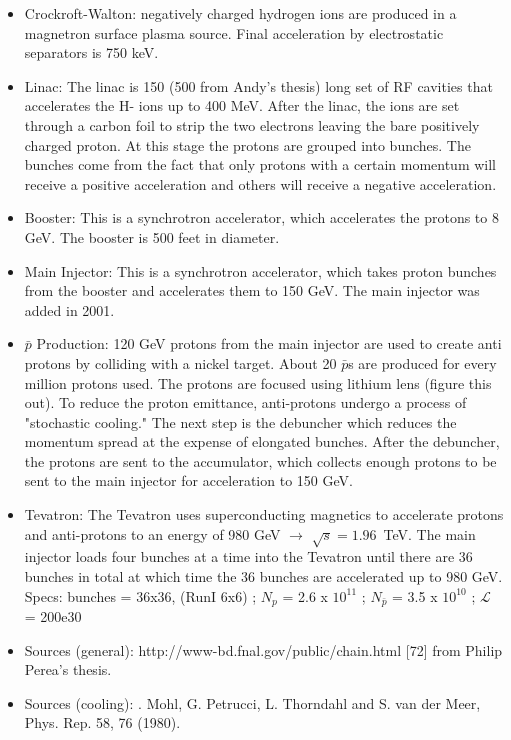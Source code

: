  
\begin{itemize}
\item Crockroft-Walton: negatively charged hydrogen ions are produced in a magnetron surface plasma source. Final acceleration by electrostatic separators is 750 keV.
\item Linac: The linac is 150 (500 from Andy's thesis) long set of RF cavities that accelerates the H- ions up to 400 MeV. After the linac, the ions are set through a carbon foil to strip the two electrons leaving the bare positively charged proton. At this stage the protons are grouped into bunches. The bunches come from the fact that only protons with a certain momentum will receive a positive acceleration and others will receive a negative acceleration. 
\item Booster: This is a synchrotron accelerator, which accelerates the protons to 8 GeV. The booster is 500 feet in diameter. 
\item Main Injector: This is a synchrotron accelerator, which takes proton bunches from the booster and accelerates them to 150 GeV. The main injector was added in 2001.
\item $\bar{p}$ Production: 120 GeV protons from the main injector are used to create anti protons by colliding with a nickel target. About 20 $\bar{p}$s are produced for every million protons used. The protons are focused using lithium lens (figure this out). To reduce the proton emittance, anti-protons undergo a process of "stochastic cooling." The next step is the debuncher which reduces the momentum spread at the expense of elongated bunches. After the debuncher, the protons are sent to the accumulator, which collects enough protons to be sent to the main injector for acceleration to 150 GeV.
\item Tevatron: The Tevatron uses superconducting magnetics to accelerate protons and anti-protons to an energy of 980 GeV $\rightarrow$ $\sqrt{s} = 1.96$~TeV. The main injector loads four bunches at a time into the Tevatron until there are 36 bunches in total at which time the 36 bunches are accelerated up to 980 GeV. Specs: bunches = 36x36, (RunI 6x6) ; $N_{p}$ = 2.6 x $10^{11}$ ; $N_{\bar{p}}$ = 3.5 x $10^{10}$ ; $\mathcal{L}$ = 200e30
\item Sources (general): http://www-bd.fnal.gov/public/chain.html [72] from Philip Perea's thesis.
\item Sources (cooling): . Mohl, G. Petrucci, L. Thorndahl and S. van der Meer, Phys. Rep. 58, 76 (1980).
\end{itemize}

